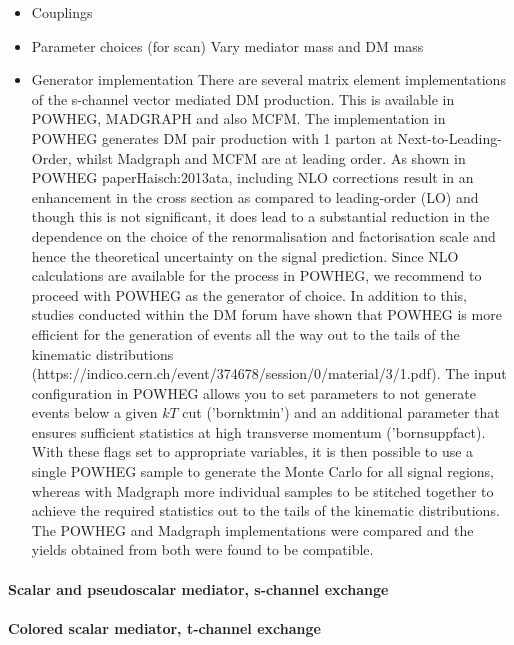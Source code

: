 \begin{itemize}
\begin{itemize}
\end{itemize}
\item Couplings
\item Parameter choices (for scan)
Vary mediator mass and DM mass 
\item Generator implementation
There are several matrix element implementations of the s-channel vector mediated DM production. This is available in POWHEG, MADGRAPH and also MCFM.
The implementation in POWHEG generates DM pair production with 1 parton at Next-to-Leading-Order, whilst Madgraph and MCFM are at leading order. As shown in POWHEG paper{Haisch:2013ata}, including NLO corrections result in an enhancement in the cross section as compared to leading-order (LO) and though this is not significant, it does lead to a substantial reduction in the dependence on the choice of the renormalisation and factorisation scale and hence the theoretical uncertainty on the signal prediction. 
Since NLO calculations are available for the process in POWHEG, we recommend to proceed with POWHEG as the generator of choice. 
In addition to this, studies conducted within the DM forum have shown that POWHEG is more efficient for the generation of events all the way out to the tails of the kinematic distributions (https://indico.cern.ch/event/374678/session/0/material/3/1.pdf). 
The input configuration in POWHEG allows you to set parameters to not generate events below a given $k{T}$ cut ('bornktmin') and an additional parameter that ensures sufficient statistics at high transverse momentum ('bornsuppfact). With these flags set to appropriate variables, it is then possible to use a single POWHEG sample to generate the Monte Carlo for all signal regions, whereas with Madgraph more individual samples to be stitched together to achieve the required statistics out to the tails of the kinematic distributions. 
The POWHEG and Madgraph implementations were compared and the yields obtained from both were found to be compatible.  
\end{itemize}

\paragraph{Scalar and pseudoscalar mediator, s-channel exchange}

\paragraph{Colored scalar mediator, t-channel exchange}

